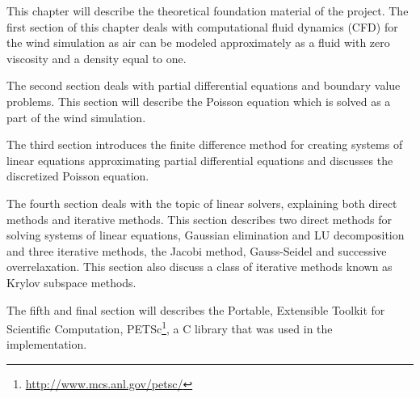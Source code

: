 This chapter will describe the theoretical foundation material of the project. 
The first section of this chapter deals with computational fluid dynamics (CFD) 
for the wind simulation as air can be modeled approximately as a fluid with 
zero viscosity and a density equal to one\cite{originalSnowThesis}.

The second section deals with partial differential equations and boundary value
problems. This section will describe the Poisson equation which is solved as a 
part of the wind simulation.

The third section introduces the finite difference method for creating systems of
linear equations approximating partial differential equations and discusses
the discretized Poisson equation.

The fourth section deals with the topic of linear solvers, explaining both direct
methods and iterative methods. This section describes two direct
methods for solving systems of linear equations, Gaussian elimination and LU
decomposition and three iterative methods, the Jacobi method, Gauss-Seidel and
successive overrelaxation. This section also discuss a class of iterative methods 
known as Krylov subspace methods. 

The fifth and final section will describes the Portable, Extensible Toolkit for
Scientific Computation, PETSc\footnote{\url{http://www.mcs.anl.gov/petsc/}}, a C 
library that was used in the implementation.
